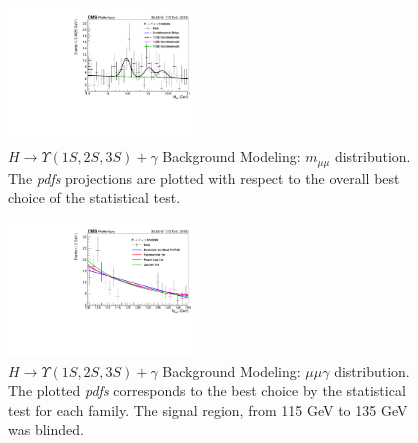 \begin{figure}[!htbp]
\begin{center}
\includegraphics[width=0.45\textwidth]{figures_and_tables/fitPlotFiles2D/ftestOutput2D/outdir_HToUpsilonPhoton_Cat0/bkgfTest-Data/mMuMU_multipdf_UntaggedTag_0}\hspace*{1.cm}
\end{center}\vspace*{-.5cm}
\caption{$H \rightarrow \Upsilon(1S,2S,3S) +\gamma$ Background Modeling: $m_{\mu\mu}$ distribution. The \textit{pdfs} projections are plotted with respect to the overall best choice of the statistical test.}
\label{fig:HToUpsilon_mMuMU_Projection}
\end{figure}


\begin{figure}[!htbp]
\begin{center}
\includegraphics[width=0.45\textwidth]{figures_and_tables/fitPlotFiles2D/ftestOutput2D/outdir_HToUpsilonPhoton_Cat0/bkgfTest-Data/mHZ_multipdf_UntaggedTag_0}\hspace*{1.cm}
\end{center}\vspace*{-.5cm}
\caption{$H \rightarrow \Upsilon(1S,2S,3S) +\gamma$ Background Modeling: $\mu\mu\gamma$ distribution. The plotted \textit{pdfs} corresponds to the best choice by the statistical test for each family. The signal region, from 115 GeV to 135 GeV was blinded.}
\label{fig:HToUpsilon_mHZ_Projection}
\end{figure}


